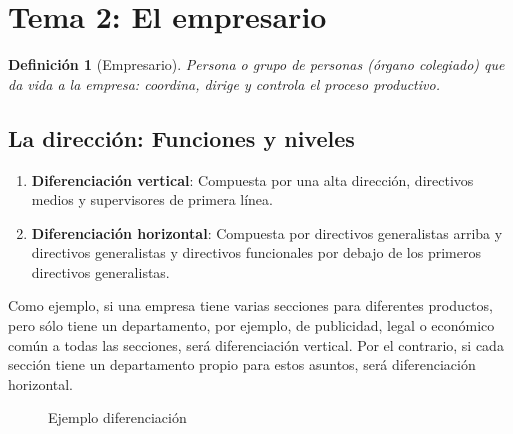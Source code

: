 \documentclass[12pt]{article}
\theoremstyle{definition_wo_parentheses}
\newtheorem{definicion}{Definición}[section]
\begin{document}
\section{Tema 2: El empresario}
\begin{definicion}[Empresario]
	Persona o grupo de personas (órgano colegiado) que da vida a la empresa: coordina, dirige y controla el proceso productivo.
\end{definicion}

\subsection{La dirección: Funciones y niveles}
\begin{enumerate}
\item \textbf{Diferenciación vertical}: Compuesta por una alta dirección, directivos medios y supervisores de primera línea.
\item \textbf{Diferenciación horizontal}: Compuesta por directivos generalistas arriba y directivos generalistas y directivos funcionales por debajo de los primeros directivos generalistas.
\end{enumerate}

	Como ejemplo, si una empresa tiene varias secciones para diferentes productos, pero sólo tiene un departamento, por ejemplo, de publicidad, legal o económico común a todas las secciones, será diferenciación vertical. Por el contrario, si cada sección tiene un departamento propio para estos asuntos, será diferenciación horizontal.

\begin{figure}[H]
 \centering
 \caption{Ejemplo diferenciación}
 \label{f:dif}
\end{figure}
\end{document}
